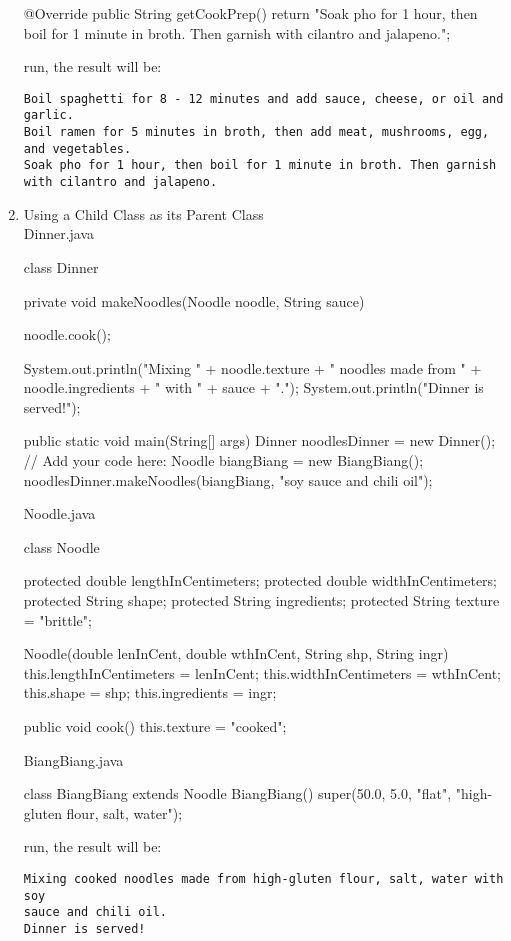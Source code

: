 \documentclass[a4paper,12pt]{article}
\begin{document}
\begin{enumerate}
\begin{javacode}
{  @Override
  public String getCookPrep() {    
    return "Soak pho for 1 hour, then boil for 1 minute in broth. Then garnish with cilantro and jalapeno.";    
  }  
}
\end{javacode}
run, the result will be:
\begin{verbatim}
Boil spaghetti for 8 - 12 minutes and add sauce, cheese, or oil and garlic.
Boil ramen for 5 minutes in broth, then add meat, mushrooms, egg, and vegetables.
Soak pho for 1 hour, then boil for 1 minute in broth. Then garnish with cilantro and jalapeno.
\end{verbatim}

\item Using a Child Class as its Parent Class\\
Dinner.java
\begin{javacode}
class Dinner {  
  private void makeNoodles(Noodle noodle, String sauce) {    
    noodle.cook();
    
    System.out.println("Mixing " + noodle.texture + " noodles made from " + noodle.ingredients + " with " + sauce + ".");
    System.out.println("Dinner is served!");    
  }
  
  public static void main(String[] args) {    
    Dinner noodlesDinner = new Dinner();
    // Add your code here:
    Noodle biangBiang = new BiangBiang();
    noodlesDinner.makeNoodles(biangBiang, "soy sauce and chili oil");    
  }  
}
\end{javacode}

Noodle.java
\begin{javacode}
class Noodle {  
  protected double lengthInCentimeters;
  protected double widthInCentimeters;
  protected String shape;
  protected String ingredients;
  protected String texture = "brittle";
  
  Noodle(double lenInCent, double wthInCent, String shp, String ingr) {    
    this.lengthInCentimeters = lenInCent;
    this.widthInCentimeters = wthInCent;
    this.shape = shp;
    this.ingredients = ingr;    
  }
  
  public void cook() {    
    this.texture = "cooked";    
  }  
}
\end{javacode}

BiangBiang.java
\begin{javacode}
class BiangBiang extends Noodle {  
  BiangBiang() {    
    super(50.0, 5.0, "flat", "high-gluten flour, salt, water");    
  }  
}
\end{javacode}
run, the result will be:
\begin{verbatim}
Mixing cooked noodles made from high-gluten flour, salt, water with soy 
sauce and chili oil.
Dinner is served!
\end{verbatim}


\end{enumerate}
\end{document}
